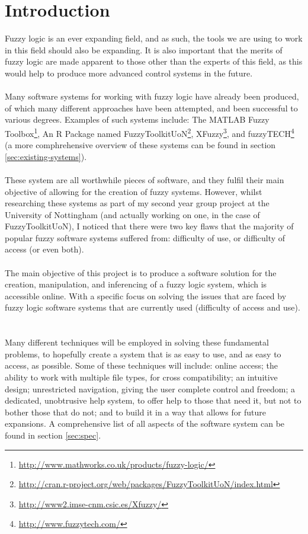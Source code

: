 \section{Introduction}
Fuzzy logic is an ever expanding field, and as such, the tools we are using to work in this field should also be expanding. It is also important that the merits of fuzzy logic are made apparent to those other than the experts of this field, as this would help to produce more advanced control systems in the future.\ \\
\ \\
Many software systems for working with fuzzy logic have already been produced, of which many different approaches have been attempted, and been successful to various degrees. Examples of such systems include: The MATLAB Fuzzy Toolbox\footnote{\url{http://www.mathworks.co.uk/products/fuzzy-logic/}}, An R Package named  FuzzyToolkitUoN\footnote{\url{http://cran.r-project.org/web/packages/FuzzyToolkitUoN/index.html}}, XFuzzy\footnote{\url{http://www2.imse-cnm.csic.es/Xfuzzy/}}, and fuzzyTECH\footnote{\url{http://www.fuzzytech.com/}} (a more comphrehensive overview of these systems can be found in section \ref{sec:existing-systems}).\ \\
\ \\
These system are all worthwhile pieces of software, and they fulfil their main objective of allowing for the creation of fuzzy systems. However, whilst researching these systems as part of my second year group project at the University of Nottingham (and actually working on one, in the case of FuzzyToolkitUoN), I noticed that there were two key flaws that the majority of popular fuzzy software systems suffered from: difficulty of use, or difficulty of access (or even both). \ \\
\ \\
The main objective of this project is to produce a software solution for the creation, manipulation, and inferencing of a fuzzy logic system, which is accessible online. With a specific focus on solving the issues that are faced by fuzzy logic software systems that are currently used (difficulty of access and use). \ \\
\ \\
Many different techniques will be employed in solving these fundamental problems, to hopefully create a system that is as easy to use, and as easy to access, as possible. Some of these techniques will include: online access; the ability to work with multiple file types, for cross compatibility; an intuitive design; unrestricted navigation, giving the user complete control and freedom; a dedicated, unobtrusive help system, to offer help to those that need it, but not to bother those that do not; and to build it in a way that allows for future expansions. A comprehensive list of all aspects of the software system can be found in section \ref{sec:spec}.\ \\
